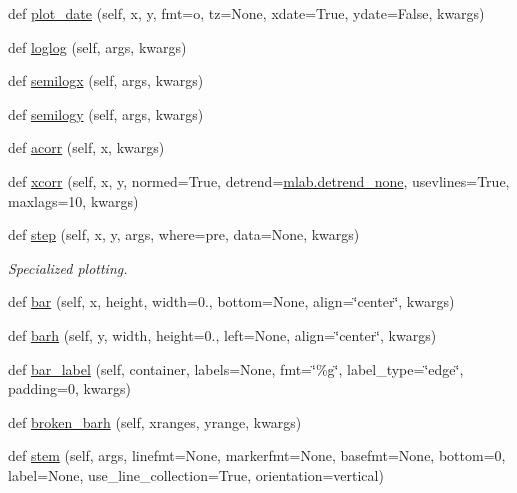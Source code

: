 \begin{DoxyCompactItemize}
def \hyperlink{classmatplotlib_1_1axes_1_1__axes_1_1Axes_ad35201761ba20ced770235d6ce4f0fa2}{plot\+\_\+date} (self, x, y, fmt=\textquotesingle{}o\textquotesingle{}, tz=None, xdate=True, ydate=False, kwargs)
\item 
def \hyperlink{classmatplotlib_1_1axes_1_1__axes_1_1Axes_a18fa810319e66528b71d165da51cc453}{loglog} (self, args, kwargs)
\item 
def \hyperlink{classmatplotlib_1_1axes_1_1__axes_1_1Axes_ae6af2a20a1540874f4b64c19e783b584}{semilogx} (self, args, kwargs)
\item 
def \hyperlink{classmatplotlib_1_1axes_1_1__axes_1_1Axes_a0f528c3e2a4da34394c9a3c062656ab4}{semilogy} (self, args, kwargs)
\item 
def \hyperlink{classmatplotlib_1_1axes_1_1__axes_1_1Axes_a542b7fad852ef55ddda7047afdf6741d}{acorr} (self, x, kwargs)
\item 
def \hyperlink{classmatplotlib_1_1axes_1_1__axes_1_1Axes_a7042d434b13660321d26592b002976ee}{xcorr} (self, x, y, normed=True, detrend=\hyperlink{namespacematplotlib_1_1mlab_a359979aa8e0e635738648ca88ebd5e1d}{mlab.\+detrend\+\_\+none}, usevlines=True, maxlags=10, kwargs)
\item 
def \hyperlink{classmatplotlib_1_1axes_1_1__axes_1_1Axes_a1e0d2f9a2b9a28defee1c8632c5db143}{step} (self, x, y, args, where=\textquotesingle{}pre\textquotesingle{}, data=None, kwargs)
\begin{DoxyCompactList}\small\item\em Specialized plotting. \end{DoxyCompactList}\item 
def \hyperlink{classmatplotlib_1_1axes_1_1__axes_1_1Axes_abedbbc828dec3e3c060e79b5cdb8aced}{bar} (self, x, height, width=0., bottom=None, align=\char`\"{}center\char`\"{}, kwargs)
\item 
def \hyperlink{classmatplotlib_1_1axes_1_1__axes_1_1Axes_a33485675479b57029c75b3ecd0f65d98}{barh} (self, y, width, height=0., left=None, align=\char`\"{}center\char`\"{}, kwargs)
\item 
def \hyperlink{classmatplotlib_1_1axes_1_1__axes_1_1Axes_a2f5e4b4e314f256c63aa028bacda3eef}{bar\+\_\+label} (self, container, labels=None, fmt=\char`\"{}\%g\char`\"{}, label\+\_\+type=\char`\"{}edge\char`\"{}, padding=0, kwargs)
\item 
def \hyperlink{classmatplotlib_1_1axes_1_1__axes_1_1Axes_a84c05785845203ad5e53298944250fbd}{broken\+\_\+barh} (self, xranges, yrange, kwargs)
\item 
def \hyperlink{classmatplotlib_1_1axes_1_1__axes_1_1Axes_a7e8bc70a757646b64956417df973f95f}{stem} (self, args, linefmt=None, markerfmt=None, basefmt=None, bottom=0, label=None, use\+\_\+line\+\_\+collection=True, orientation=\textquotesingle{}vertical\textquotesingle{})

\end{DoxyCompactItemize}
